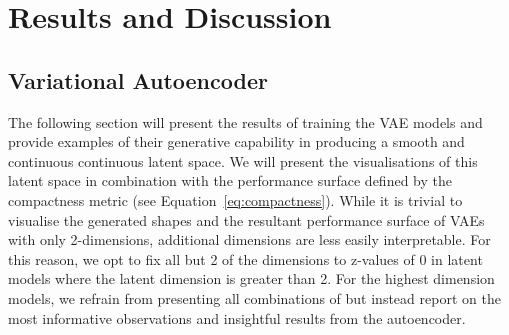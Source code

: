 \documentclass{article}
\begin{document}
\begin{table}[h]
\centering
{}
\caption{Genetic Algorithm Tested Optimisation Tasks for Latent Representations Shapes}
\label{tab:GA_models_latent}
\end{table}


\newpage{}

\section{Results and Discussion}\label{Results_section}
\subsection{Variational Autoencoder}
The following section will present the results of training the VAE models and provide examples of their generative capability in producing a smooth and continuous continuous latent space. We will present the visualisations of this latent space in combination with the performance surface defined by the compactness metric (see Equation~\eqref{eq:compactness}). While it is trivial to visualise the generated shapes and the resultant performance surface of VAEs with only 2-dimensions, additional dimensions are less easily interpretable. For this reason, we opt to fix all but 2 of the dimensions to z-values of 0 in latent models where the latent dimension is greater than 2. For the highest dimension models, we refrain from presenting all combinations of but instead report on the most informative observations and insightful results from the autoencoder.
\end{document}
